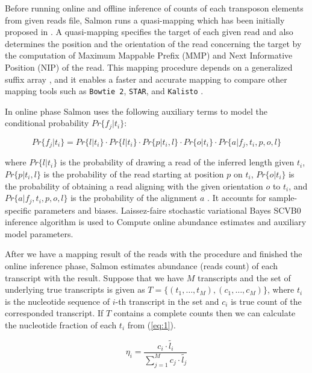 \documentclass{ws-procs11x85}
\begin{document}
Before running online and offline inference of counts of each transposon elements from given reads file,
Salmon runs a quasi-mapping which has been initially proposed in \cite{srivastava2016rapmap}. A quasi-mapping specifies the target of each given read and also determines the position and the orientation of the read concerning the target by the computation of 
Maximum Mappable Prefix (MMP) \cite{li2012exploring} and Next Informative Position (NIP) of the read.
This mapping procedure depends on a generalized suffix array \cite{manber1993suffix}, 
and it enables a faster and accurate mapping to compare other mapping tools such as \verb|Bowtie 2|, \verb|STAR|, and \verb|Kalisto| \cite{srivastava2016rapmap}. 

In online phase Salmon uses the following auxiliary terms to model the conditional probability $Pr \{f_j | t_i \}$:

\begin{equation}
Pr \{f_j | t_i \} = Pr \{ l | t_i \} 
\cdot Pr \{ l | t_i \} 
\cdot Pr \{ p | t_i, l \} 
\cdot Pr \{ o | t_i \} 
\cdot Pr \{ a | f_j, t_i, p, o, l \} 
\end{equation}

where $Pr \{ l | t_i \}$ 
is the probability of drawing a read of the inferred length given $t_i$,  
$Pr \{ p | t_i, l \}$ is the probability of the read starting at position $p$ on $t_i$,
$Pr \{ o | t_i \}$ is the probability of obtaining a read
aligning with the given orientation $o$ to $t_i$, and
$Pr \{ a | f_j, t_i, p, o, l \} $ is the probability of the alignment $a$ \cite{patro2017salmon}. It accounts for sample-specific parameters and biases.
Laissez-faire stochastic variational Bayes SCVB0 inference algorithm is used to 
Compute online abundance estimates and auxiliary model parameters\cite{patro2017salmon}.

After we have a mapping result of the reads with the procedure and finished the online inference phase, 
Salmon estimates abundance (reads count) of each transcript with the result. Suppose that
we have $M$ transcripts and the set of underlying true transcripts is given as
$T = \{(t_1, \dots , t_M), (c_1, \dots, c_M) \}$, where $t_i$ is the nucleotide sequence of $i$-th transcript in the set and $c_i$ is true count of the corresponded transcript. 
If $T$ contains a complete counts then we can calculate the nucleotide fraction \cite{li2009rna} of each $t_i$ from (\ref{eq:1}).
 

\begin{equation} \label{eq:1}
\eta_i = \frac{c_i \cdot \widetilde{l_i} }{\sum_{j=1}^{M} c_j \cdot \widetilde{l_j}}
\end{equation}
\end{document}
